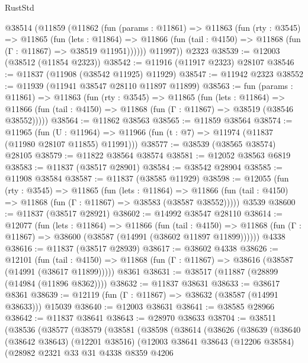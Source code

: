 \begin{lexlean}{RustStd}
\begin{coremodule}
{\begin{coremodule}
{{{{{{{{{{{{{{{{{{{{{{{{{{{{{{{{{{{{{{{{{{{{{{{{{{    @38514
      (@11859
        (@11862
          (fun (params : @11861) =>
          @11863
            (fun (rty : @3545) =>
            @11865
              (fun (lets : @11864) =>
              @11866 (fun (tail : @4150) => @11868 (fun (Γ : @11867) => @38519 @11951))))))
        @11997))
    @2323
@38539 := @12003 (@38512 (@11854 @2323))
@38542 := @11916 (@11917 @2323) @28107
@38546 := @11837 (@11908 (@38542 @11925) @11929)
@38547 := @11942 @2323
@38552 := @11939 (@11941 @38547 @28110 @11897 @11899)
@38563 := fun (params : @11861) =>
  @11863
    (fun (rty : @3545) =>
    @11865
      (fun (lets : @11864) =>
      @11866 (fun (tail : @4150) => @11868 (fun (Γ : @11867) => @38519 (@38546 @38552)))))
@38564 := @11862 @38563
@38565 := @11859 @38564
@38574 := @11965
    (fun (U : @11964) => @11966 (fun (t : @7) => @11974 (@11837 (@11980 @28107 @11855) @11991)))
@38577 := @38539 (@38565 @38574) @28105
@38579 := @11822 @38564 @38574
@38581 := @12052 @38563 @6819
@38583 := @11837 (@38517 @28901)
@38584 := @38542 @28904
@38585 := @11908 @38584
@38587 := @11837 (@38585 @11929)
@38598 := @12055
    (fun (rty : @3545) =>
    @11865
      (fun (lets : @11864) =>
      @11866 (fun (tail : @4150) => @11868 (fun (Γ : @11867) => @38583 (@38587 @38552)))))
    @3539
@38600 := @11837 (@38517 @28921)
@38602 := @14992 @38547 @28110
@38614 := @12077
    (fun (lets : @11864) =>
    @11866
      (fun (tail : @4150) =>
      @11868 (fun (Γ : @11867) => @38600 (@38587 (@14991 (@38602 @11897 @11899))))))
    @4338
@38616 := @11837 (@38517 @28939)
@38617 := @38602 @4338
@38626 := @12101
    (fun (tail : @4150) => @11868 (fun (Γ : @11867) => @38616 (@38587 (@14991 (@38617 @11899)))))
    @8361
@38631 := @38517 (@11887 (@28899 (@14984 (@11896 @8362))))
@38632 := @11837 @38631
@38633 := @38617 @8361
@38639 := @12119 (fun (Γ : @11867) => @38632 (@38587 (@14991 @38633))) @15039
@38640 := @12003 @38631
@38641 := @38585 @28966
@38642 := @11837 @38641
@38643 := @28970 @38633
@38704 := @38511
    (@38536
      (@38577
        (@38579
          (@38581
            (@38598
              (@38614
                (@38626
                  (@38639
                    (@38640
                      (@38642 @38643)
                      (@12201 @38516)
                      (@12003
                        @38641
                        @38643
                        (@12206 @38584)
                        (@28982
                          @2321
                          @33
                          @31
                          @4338
                          @8359
                          @4206
}}}}}}}}}}}}}}}}}}}}}}}}}}}}}}}}}}}}}}}}}}}}}}}}}}
\end{coremodule}}
\end{coremodule}
\end{lexlean}
